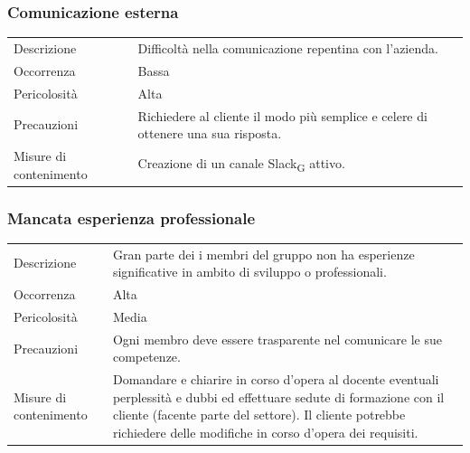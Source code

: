 \documentclass{article}
\begin{document}
\subsubsection{Comunicazione esterna}
\begin{center}
\begin{tabular}{P{10em} P{20em}} 
     Descrizione & Difficoltà nella comunicazione repentina con l'azienda.\\ 
    Occorrenza & Bassa\\
    Pericolosità & Alta \\
    Precauzioni & Richiedere al cliente il modo più semplice e celere di ottenere una sua risposta. \\
    Misure di contenimento & Creazione di un canale Slack\textsubscript{G} attivo.\\
\end{tabular}
\label{tab:comesterna}
\end{center}

\subsubsection{Mancata esperienza professionale}
\begin{center}
\begin{tabular}{P{10em} P{20em}} 
     Descrizione & Gran parte dei i membri del gruppo non ha esperienze significative in ambito di sviluppo o professionali.\\ 
    Occorrenza & Alta\\
    Pericolosità & Media \\
    Precauzioni & Ogni membro deve essere trasparente nel comunicare le sue competenze. \\
    Misure di contenimento & Domandare e chiarire in corso d'opera al docente eventuali perplessità e dubbi ed effettuare sedute di formazione con il cliente (facente parte del settore). Il cliente potrebbe richiedere delle modifiche in corso d'opera dei requisiti.
 \\
\end{tabular}
\label{tab:espprof}
\end{center}
\end{document}
